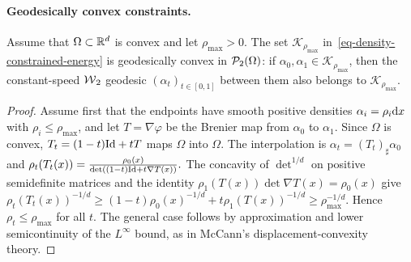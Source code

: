 \paragraph{Geodesically convex constraints.}
\label{par-geodesically-convex-constraints}
\begin{proposition}\label{prop-density-cap-geodesic-convex}
Assume that $\Omega\subset\mathbb{R}^d$ is convex and let $\rho_{\max}>0$. The set $\mathcal K_{\rho_{\max}}$ in~\eqref{eq-density-constrained-energy} is geodesically convex in $\mathcal{P}_2(\Omega)$: if $\alpha_0,\alpha_1\in\mathcal K_{\rho_{\max}}$, then the constant-speed $\operatorname{\mathcal{W}}_2$ geodesic $(\alpha_t)_{t\in[0,1]}$ between them also belongs to $\mathcal K_{\rho_{\max}}$.
\end{proposition}
\begin{proof}
Assume first that the endpoints have smooth positive densities $\alpha_i=\rho_i\mathrm{d} x$ with $\rho_i\leq\rho_{\max}$, and let $T=\nabla\varphi$ be the Brenier map from $\alpha_0$ to $\alpha_1$. Since $\Omega$ is convex, $T_t=(1-t)\mathrm{Id}+tT$ maps $\Omega$ into $\Omega$. The interpolation is $\alpha_t=(T_t)_\sharp\alpha_0$ and
\(\rho_t(T_t(x))=\frac{\rho_0(x)}{\det((1-t)\mathrm{Id}+t\nabla T(x))}.\)
The concavity of $\det^{1/d}$ on positive semidefinite matrices and the identity $\rho_1(T(x))\det\nabla T(x)=\rho_0(x)$ give
\(\rho_t(T_t(x))^{-1/d} \geq (1-t)\rho_0(x)^{-1/d}+t\rho_1(T(x))^{-1/d} \geq\rho_{\max}^{-1/d}.\)
Hence $\rho_t\leq\rho_{\max}$ for all $t$. The general case follows by approximation and lower semicontinuity of the $L^\infty$ bound, as in McCann's displacement-convexity theory.
\end{proof}
